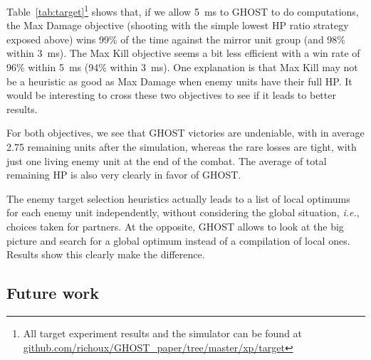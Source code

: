\documentclass[journal]{IEEEtran}
\newcommand{\minormod}[1]{#1 \xspace}
\newcommand{\ghost}{\textsc{GHOST}\xspace}
\newcommand{\ie}{\textit{i.e.}}
\begin{document}

Table~\ref{tab:target}\footnote{All target experiment results and the simulator can be found at
\href{https://github.com/richoux/GHOST\_paper/tree/master/xp/target}{github.com/richoux/GHOST\_paper/tree/master/xp/target}}
shows that, if we allow 5~ms to \ghost to do computations, the Max Damage objective \minormod{(shooting with the simple lowest HP ratio strategy exposed above)} wins \minormod{99\%} of the time against the
mirror unit group (and \minormod{98\%} within 3~ms).  
The Max Kill objective seems a bit less efficient with a win
rate of \minormod{96\%} within 5~ms (\minormod{94\%} within 3~ms). One explanation is that
Max Kill may not be a heuristic as good as Max Damage when enemy units
have their full HP.  It would be interesting to cross these two
objectives to see if it leads to better results.

For both objectives, we see that \ghost victories are undeniable, with
in average \minormod{2.75} remaining units after the simulation, whereas the rare
losses are tight, with just one living enemy unit at the end of the
combat. The average of total remaining HP is also very clearly in
favor of \ghost.

\minormod{The enemy target selection heuristics actually leads to a list of local optimums for each enemy unit independently, without considering the global situation, \ie, choices taken for partners. At the opposite, \ghost allows to look at the big picture and search for a global optimum instead of a compilation of local ones. Results show this clearly make the difference.}

\subsection{Future work}
\end{document}
